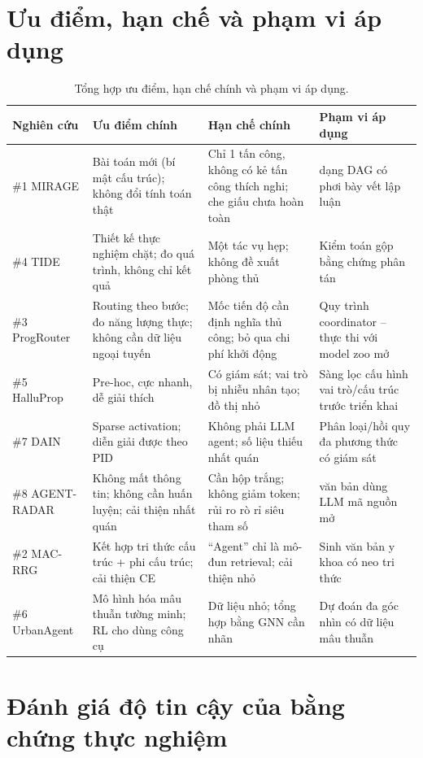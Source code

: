 \section{Ưu điểm, hạn chế và phạm vi áp dụng}
\label{sec:cmp-proscons}

\begin{table}[!htbp]
\centering
\footnotesize
\caption{Tổng hợp ưu điểm, hạn chế chính và phạm vi áp dụng.}
\label{tab:cmp-proscons}
\begin{tabularx}{\textwidth}{L{2.0cm} Y Y L{2.8cm}}
\toprule
\textbf{Nghiên cứu} & \textbf{Ưu điểm chính} & \textbf{Hạn chế chính} & \textbf{Phạm vi áp dụng} \\
\midrule
\#1 MIRAGE & Bài toán mới (bí mật cấu trúc); không đổi tính toán thật & Chỉ 1 tấn công, không có kẻ tấn công thích nghi; che giấu chưa hoàn toàn & \MAS{} dạng DAG có phơi bày vết lập luận \\
\#4 TIDE & Thiết kế thực nghiệm chặt; đo quá trình, không chỉ kết quả & Một tác vụ hẹp; không đề xuất phòng thủ & Kiểm toán \MAS{} gộp bằng chứng phân tán \\
\#3 ProgRouter & Routing theo bước; đo năng lượng thực; không cần dữ liệu ngoại tuyến & Mốc tiến độ cần định nghĩa thủ công; bỏ qua chi phí khởi động & Quy trình coordinator -- thực thi với model zoo mở \\
\#5 HalluProp & Pre-hoc, cực nhanh, dễ giải thích & Có giám sát; vai trò bị nhiễu nhân tạo; đồ thị nhỏ & Sàng lọc cấu hình vai trò/cấu trúc trước triển khai \\
\#7 DAIN & Sparse activation; diễn giải được theo PID & Không phải LLM agent; số liệu thiếu nhất quán & Phân loại/hồi quy đa phương thức có giám sát \\
\#8 AGENT-RADAR & Không mất thông tin; không cần huấn luyện; cải thiện nhất quán & Cần hộp trắng; không giảm token; rủi ro rò rỉ siêu tham số & \MAS{} văn bản dùng LLM mã nguồn mở \\
\#2 MAC-RRG & Kết hợp tri thức cấu trúc + phi cấu trúc; cải thiện CE & ``Agent'' chỉ là mô-đun retrieval; cải thiện nhỏ & Sinh văn bản y khoa có neo tri thức \\
\#6 UrbanAgent & Mô hình hóa mâu thuẫn tường minh; RL cho dùng công cụ & Dữ liệu nhỏ; tổng hợp bằng GNN cần nhãn & Dự đoán đa góc nhìn có dữ liệu mâu thuẫn \\
\bottomrule
\end{tabularx}
\end{table}

\section{Đánh giá độ tin cậy của bằng chứng thực nghiệm}
\label{sec:cmp-evidence}

